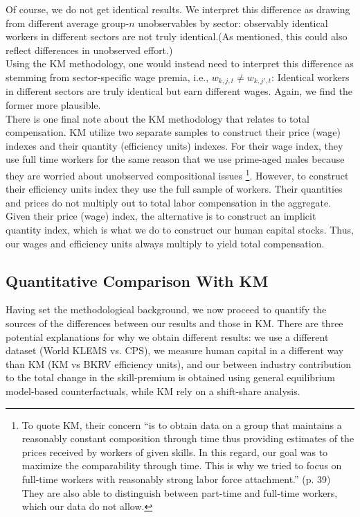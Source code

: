 \documentclass[10pt]{article}
\begin{document}
Of course, we do not get identical results. We interpret this difference as drawing from different average group-$n$ unobservables by sector: observably identical workers in different sectors are not truly identical.(As mentioned, this could also reflect differences in unobserved effort.)\\

Using the KM methodology, one would instead need to interpret this difference as stemming from sector-specific wage premia, i.e., $w_{k,j,t}\neq w_{k,j',t}$: Identical workers in different sectors are truly identical but earn different wages. Again, we find the former more plausible.\\

There is one final note about the KM methodology that relates to total compensation. KM utilize two separate samples to construct their price (wage) indexes and their quantity (efficiency units) indexes. For their wage index, they use full time workers for the same reason that we use prime-aged males because they are worried about unobserved compositional issues \footnote{To quote KM, their concern ``is to obtain data on a group that maintains a reasonably constant composition through time thus providing estimates of the prices received by workers of given skills. In this regard, our goal was to maximize the comparability through time. This is why we tried to focus on full-time workers with reasonably strong labor force attachment.'' (p. 39) They are also able to distinguish between part-time and full-time workers, which our data do not allow.}. However, to construct their efficiency units index they use the full sample of workers. Their quantities and prices do not multiply out to total labor compensation in the aggregate. Given their price (wage) index, the alternative is to construct an implicit quantity index, which is what we do to construct our human capital stocks. Thus, our wages and efficiency units always multiply to yield total compensation. 


\medskip
\subsection{Quantitative Comparison With KM} \label{sec:quant_differences_with_KM}
Having set the methodological background, we now proceed to quantify the sources of the differences between our results and those in KM. There are three potential explanations for why we obtain different results: we use a different dataset (World KLEMS vs. CPS), we measure human capital in a different way than KM (KM vs BKRV efficiency units), and our between industry contribution to the total change in the skill-premium is obtained using general equilibrium model-based counterfactuals, while KM rely on a shift-share analysis.\\
\end{document}
